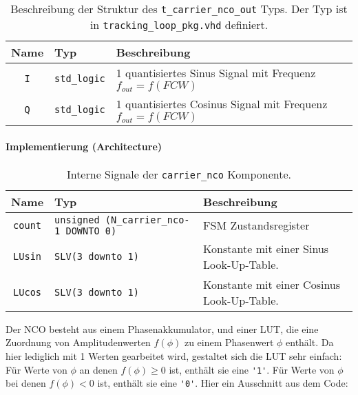 \begin{table}[htbp]
    \ttabbox
    {
        \caption[Typdefinition \lstinline$t_carrier_nco_out$]{Beschreibung der Struktur des \lstinline$t_carrier_nco_out$ Typs. Der Typ ist in \lstinline$tracking_loop_pkg.vhd$ definiert.}
        \label{Tab_t_carrier_nco_out}
    }
    {
    \begin{tabular}{c  p{2cm} p{6cm}}
        \toprule
        Name				& Typ                   & Beschreibung \\
        \midrule
        \lstinline$I$		& \lstinline$std_logic$	& \SI{1}{\bit} quantisiertes Sinus Signal mit Frequenz $f_{out}=f(FCW)$\\
        \lstinline$Q$		& \lstinline$std_logic$	& \SI{1}{\bit} quantisiertes Cosinus Signal mit Frequenz $f_{out}=f(FCW)$ \\
        \bottomrule
    \end{tabular}
}
\end{table}

\paragraph{Implementierung (Architecture)}

\begin{table}[htbp]
    \ttabbox
    {
        \caption[Carrier NCO interne Signale]{Interne Signale der \lstinline$carrier_nco$ Komponente.}
        \label{TabCarrierNCO_ArchSignals}
    }
    {
    \begin{tabular}{c  p{2cm} p{6cm}}
        \toprule
        Name      & Typ         & Beschreibung \\
        \midrule
        \lstinline$count$  & \lstinline$unsigned (N_carrier_nco-1 DOWNTO 0)$             & \gls{FSM} Zustandsregister\\
        \lstinline$LUsin$  & \lstinline$SLV(3 downto 1)$ & Konstante mit einer Sinus Look-Up-Table.\\
        \lstinline$LUcos$  & \lstinline$SLV(3 downto 1)$ & Konstante mit einer Cosinus Look-Up-Table.\\
        \bottomrule
    \end{tabular}
}
\end{table}

Der NCO besteht aus einem Phasenakkumulator, und einer \gls{LUT}, die eine Zuordnung von Amplitudenwerten $f(\phi)$ zu einem Phasenwert $\phi$ enthält. Da hier lediglich mit \SI{1}{\bit} Werten gearbeitet wird, gestaltet sich die \gls{LUT} sehr einfach: Für Werte von $\phi$ an denen $f(\phi)\geq 0$ ist, enthält sie eine \lstinline$'1'$. Für Werte von $\phi$ bei denen $f(\phi)<0$ ist, enthält sie eine \lstinline$'0'$. Hier ein Ausschnitt aus dem Code:

